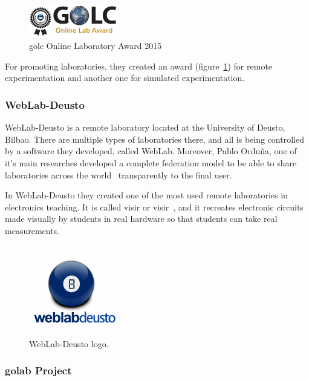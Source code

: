 \begin{figure}[!htbp]
	\centering
	\includegraphics[width=0.35\textwidth]{fig/golc-award}
	\caption{\acrshort{golc} Online Laboratory Award 2015}\label{fig:golc_award}
\end{figure}

For promoting laboratories, they created an award (figure~\ref{fig:golc_award}) for remote
experimentation and another one for simulated experimentation.

\subsubsection{WebLab-Deusto}

WebLab-Deusto is a remote laboratory located at the University of Deusto, Bilbao. There are multiple
types of laboratories there, and all is being controlled by a software they developed, called
WebLab. Moreover, Pablo Orduña, one of it's main researches developed a complete federation model
to be able to share laboratories across the world~\cite{porduna_phd} transparently to the final
user.

In WebLab-Deusto they created one of the most used remote laboratories in electronics teaching. It
is called \acrlong{visir} or \acrshort{visir}~\cite{visir}, and it recreates electronic circuits
made visually by students in real hardware so that students can take real measurements.

\begin{figure}[!htbp]
	\centering
	\includegraphics[width=0.35\textwidth]{fig/weblab}
	\caption{WebLab-Deusto logo.}
\end{figure}

\subsubsection{\acrshort{golab} Project}


